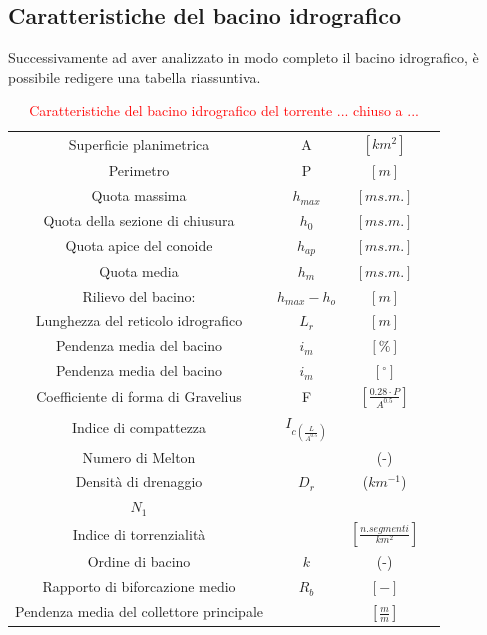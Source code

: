\subsection{Caratteristiche del bacino idrografico}
Successivamente ad aver analizzato in modo completo il bacino idrografico, è possibile redigere una tabella riassuntiva.
\begin{table}[H] \centering
    \caption{\textcolor{red}{Caratteristiche del bacino idrografico  del torrente ... chiuso a ...}}
    \label{tab:caratteristiche_bacino}
    \begin{tabular}{ cccc } 
    \toprule
    Superficie planimetrica & A &  $\left[km^2\right]$ &  \\ 
    Perimetro & P & $\left[m\right]$        &             \\ 
    Quota massima & $h_{max}$&  $\left[m s.m.\right]$       &          \\
    Quota della sezione di chiusura & $h_0$ & $\left[m s.m.\right]$        &             \\ 
    Quota apice del conoide &$h_{ap}$& $\left[m s.m.\right]$ & \\ 
    Quota media& $h_m$ & $\left[m s.m.\right]$ & \\ 
    Rilievo del bacino:& $h_{max} - h_o$ & $\left[m\right]$ & \\ 
    Lunghezza del reticolo idrografico& $L_r$& $\left[m\right]$ & \\ 
    Pendenza media del bacino& $i_m$ & $\left[\%\right]$ & \\ 
    Pendenza media del bacino& $i_m$& $\left[ ^\circ \right]$ & \\ 
    Coefficiente di forma di Gravelius& F& $\left[\frac{0.28 \cdot P}{A^{0.5}} \right]$ & \\  
    Indice di compattezza &$I_{c \left(\frac{L}{A^0.5}\right)}$ & & \\ 
    Numero di Melton& & (-) & \\ 
    Densità di drenaggio &$D_r$& ($km^{-1}$)& \\ 
    $N_1$& & & \\ 
    Indice di torrenzialità& &$\left[\frac{n. segmenti }{km^2}\right]$ & \\  
    Ordine di bacino& $k$ & (-) & \\ 
    Rapporto di biforcazione medio& $R_b$ & $\left[-\right]$ & \\  
    Pendenza media del collettore principale & & $\left[\frac{m}{m}\right]$ & \\  
    \bottomrule
\end{tabular}
\end{table}
